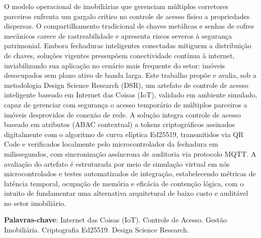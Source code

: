 \begin{resumo}
\SingleSpacing
\noindent
O modelo operacional de imobiliárias que gerenciam múltiplos corretores parceiros enfrenta um gargalo crítico no controle de acesso físico a propriedades dispersas. O compartilhamento tradicional de chaves metálicas e senhas de cofres mecânicos carece de rastreabilidade e apresenta riscos severos à segurança patrimonial. Embora fechaduras inteligentes conectadas mitiguem a distribuição de chaves, soluções vigentes pressupõem conectividade contínua à internet, inviabilizando sua aplicação no cenário mais frequente do setor: imóveis desocupados sem plano ativo de banda larga. Este trabalho propõe e avalia, sob a metodologia Design Science Research (DSR), um artefato de controle de acesso inteligente baseado em Internet das Coisas (IoT), validado em ambiente simulado, capaz de gerenciar com segurança o acesso temporário de múltiplos parceiros a imóveis desprovidos de conexão de rede. A solução integra controle de acesso baseado em atributos (ABAC contextual) a tokens criptográficos assinados digitalmente com o algoritmo de curva elíptica Ed25519, transmitidos via QR Code e verificados localmente pelo microcontrolador da fechadura em milissegundos, com sincronização assíncrona de auditoria via protocolo MQTT. A avaliação do artefato é estruturada por meio de simulação virtual em nós microcontrolados e testes automatizados de integração, estabelecendo métricas de latência temporal, ocupação de memória e eficácia de contenção lógica, com o intuito de fundamentar uma alternativa arquitetural de baixo custo e auditável no setor imobiliário.

\vspace{\onelineskip}
\noindent
\textbf{Palavras-chave}: Internet das Coisas (IoT). Controle de Acesso. Gestão Imobiliária. Criptografia Ed25519. Design Science Research.
\end{resumo}

